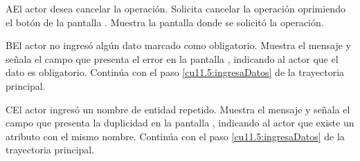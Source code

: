  \begin{UCtrayectoriaA}{A}{El actor desea cancelar la operación.}
    \UCpaso[\UCactor] Solicita cancelar la operación oprimiendo el botón  de la pantalla .
    \UCpaso[\UCsist] Muestra la pantalla donde se solicitó la operación.
 \end{UCtrayectoriaA}
 \begin{UCtrayectoriaA}{B}{El actor no ingresó algún dato marcado como obligatorio.}
    \UCpaso[\UCsist] Muestra el mensaje  y señala el campo que presenta el error en la pantalla 
	    , indicando al actor que el dato es obligatorio.
    \UCpaso[] Continúa con el paso \ref{cu11.5:ingresaDatos} de la trayectoria principal.
 \end{UCtrayectoriaA}
 \begin{UCtrayectoriaA}{C}{El actor ingresó un nombre de entidad repetido.}
    \UCpaso[\UCsist] Muestra el mensaje  y señala el campo que presenta la duplicidad en la pantalla 
	    , indicando al actor que existe un atributo con el mismo nombre.
    \UCpaso[] Continúa con el paso \ref{cu11.5:ingresaDatos} de la trayectoria principal.
 \end{UCtrayectoriaA}
 
